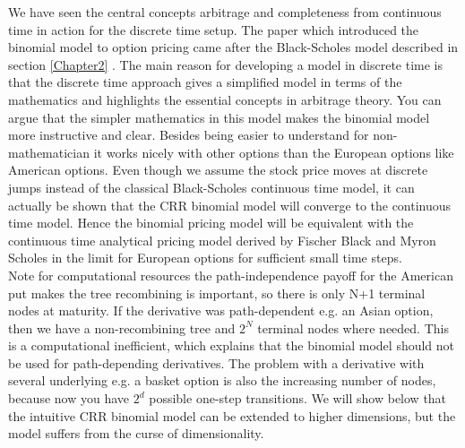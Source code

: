 We have seen the central concepts arbitrage and completeness from continuous time in action for the discrete time setup. The paper \parencite{CRR} which introduced the binomial model to option pricing came after the Black-Scholes model described in section \ref{Chapter2} \parencite{B-S-Paper}. The main reason for developing a model in discrete time is that the discrete time approach gives a simplified model in terms of the mathematics and highlights the essential concepts in arbitrage theory. You can argue that the simpler mathematics in this model makes the binomial model more instructive and clear. Besides being easier to understand for non-mathematician it works nicely with other options than the European options like American options. Even though we assume the stock price moves at discrete jumps instead of the classical Black-Scholes continuous time model, it can actually be shown that the CRR binomial model will converge to the continuous time model. Hence the binomial pricing model will be equivalent with the continuous time analytical pricing model derived by Fischer Black and Myron Scholes in the limit for European options for sufficient small time steps. \\

Note for computational resources the path-independence payoff for the American put makes the tree recombining is important, so there is only N+1 terminal nodes at maturity. If the derivative was path-dependent e.g. an Asian option, then we have a non-recombining tree and $2^{N}$ terminal nodes where needed. This is a computational inefficient, which explains that the binomial model should not be used for path-depending derivatives. The problem with a derivative with several underlying e.g. a basket option is also the increasing number of nodes, because now you have $2^d$ possible one-step transitions. We will show below that the intuitive CRR binomial model can be extended to higher dimensions, but the model suffers from the curse of dimensionality.

\newpage
